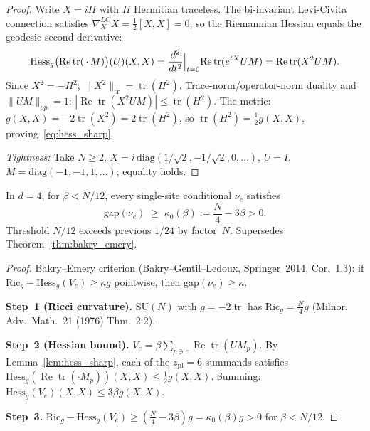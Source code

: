 \begin{proof}
Write $X=iH$ with $H$ Hermitian traceless.
The bi-invariant Levi-Civita connection satisfies $\nabla^{LC}_X X=\tfrac{1}{2}[X,X]=0$,
so the Riemannian Hessian equals the geodesic second derivative:
\begin{equation}
\label{eq:hess_formula}
  \mathrm{Hess}_g\bigl(\operatorname{Re}\operatorname{tr}(\,\cdot\,M)\bigr)(U)(X,X)
  = \frac{d^2}{dt^2}\Bigl|_{t=0}\operatorname{Re}\operatorname{tr}(e^{tX}UM)
  = \operatorname{Re}\operatorname{tr}(X^2 UM).
\end{equation}
Since $X^2=-H^2$, $\|X^2\|_{\mathrm{tr}}=\operatorname{tr}(H^2)$.
Trace-norm/operator-norm duality and $\|UM\|_{op}=1$:
$|\operatorname{Re}\operatorname{tr}(X^2 UM)|\le\operatorname{tr}(H^2)$.
The metric: $g(X,X)=-2\operatorname{tr}(X^2)=2\operatorname{tr}(H^2)$,
so $\operatorname{tr}(H^2)=\tfrac{1}{2}g(X,X)$, proving~\eqref{eq:hess_sharp}.

\emph{Tightness:} Take $N\ge 2$,
$X=i\,\mathrm{diag}(1/\sqrt{2},-1/\sqrt{2},0,\ldots)$,
$U=I$, $M=\mathrm{diag}(-1,-1,1,\ldots)$; equality holds.
\end{proof}

\begin{theorem}
\label{thm:bakry_emery_corr}
In $d=4$, for $\beta < N/12$,
every single-site conditional $\nu_e$ satisfies
\begin{equation}
\label{eq:be_corr}
  \mathrm{gap}(\nu_e) \;\ge\; \kappa_0(\beta) := \frac{N}{4} - 3\beta > 0.
\end{equation}
Threshold $N/12$ exceeds previous $1/24$ by factor~$N$. Supersedes Theorem~\ref{thm:bakry_emery}.
\end{theorem}

\begin{proof}
Bakry--Emery criterion (Bakry--Gentil--Ledoux, Springer~2014, Cor.~1.3):
if $\mathrm{Ric}_g-\mathrm{Hess}_g(V_e)\ge\kappa g$ pointwise, then $\mathrm{gap}(\nu_e)\ge\kappa$.

\textbf{Step~1 (Ricci curvature).}
$\mathrm{SU}(N)$ with $g=-2\operatorname{tr}$ has $\mathrm{Ric}_g=\tfrac{N}{4}g$
(Milnor, Adv.\ Math.\ 21 (1976) Thm.~2.2).

\textbf{Step~2 (Hessian bound).}
$V_e=\beta\sum_{p\ni e}\operatorname{Re}\operatorname{tr}(UM_p)$.
By Lemma~\ref{lem:hess_sharp}, each of the $z_{\mathrm{pl}}=6$ summands satisfies
$\mathrm{Hess}_g(\operatorname{Re}\operatorname{tr}(\cdot M_p))(X,X)\le\tfrac{1}{2}g(X,X)$.
Summing: $\mathrm{Hess}_g(V_e)(X,X)\le 3\beta g(X,X)$.

\textbf{Step~3.}
$\mathrm{Ric}_g-\mathrm{Hess}_g(V_e)\ge(\tfrac{N}{4}-3\beta)g=\kappa_0(\beta)g>0$ for $\beta<N/12$.
\end{proof}

